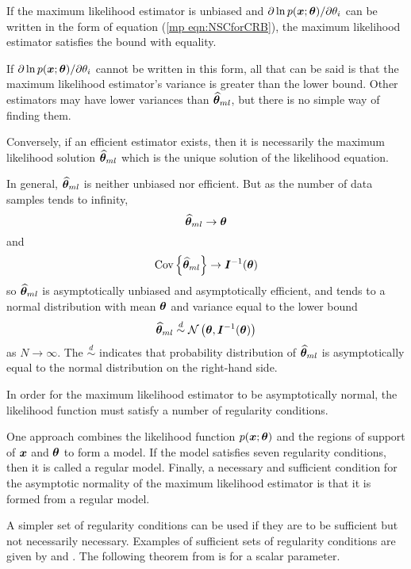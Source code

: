 If the maximum likelihood estimator is unbiased and 
${\partial}\ln p(\bm{x};\bm{\theta})/{\partial}\theta_{i}$ can be written in the form of equation 
(\ref{mp eqn:NSCforCRB}), the maximum likelihood estimator satisfies the
\CR bound with equality.  

If ${\partial}\ln p(\bm{x};\bm{\theta})/{\partial}\theta_{i}$ cannot be written in this form,
all that can be said is that the maximum likelihood estimator's variance is
greater than the \CR lower bound.  Other estimators may have lower variances 
than $\widehat{\bm{\theta}}_{ml}$, but there is no simple way of finding them.

Conversely, if an efficient estimator exists, then it is necessarily the
maximum likelihood solution $\widehat{\bm{\theta}}_{ml}$ which is the unique solution of the
likelihood equation.

In general, $\widehat{\bm{\theta}}_{ml}$ is neither unbiased nor efficient.  But as the number of
data samples tends to infinity,
\begin{equation}
\widehat{\bm{\theta}}_{ml}\to\bm{\theta}
\end{equation}
and
\begin{equation}
{\mathop{\rm Cov}\nolimits\left\{\widehat{\bm{\theta}}_{ml}\right\}}\to\bm{I}^{-1}(\bm{\theta})
\end{equation}
so $\widehat{\bm{\theta}}_{ml}$ is asymptotically unbiased and asymptotically efficient,
and tends to a normal distribution with mean $\bm{\theta}$ and variance equal to 
the \CR lower bound
\begin{equation}
\widehat{\bm{\theta}}_{ml}\stackrel{d}{\sim}{\cal N}\left(\bm{\theta},\bm{I}^{-1}(\bm{\theta})\right)
\end{equation}
as $N\rightarrow\infty$.  The $\stackrel{d}{\sim}$ indicates that
probability distribution of $\widehat{\bm{\theta}}_{ml}$ is asymptotically equal to the normal
distribution on the right-hand side.


In order for the maximum likelihood estimator to be asymptotically normal,
the likelihood function must satisfy a number of regularity conditions.  

One approach \cite[p. 175]{Ngu89b} combines the likelihood function
$p(\bm{x};\bm{\theta})$ and the regions of support of $\bm{x}$ and $\bm{\theta}$ to form a
model.   If the model satisfies seven regularity conditions, then it is
called a regular model.  Finally, a necessary and sufficient condition for
the asymptotic normality of the maximum likelihood estimator is that it is
formed from a regular model.

A simpler set of regularity conditions can be used if they are to be
sufficient but not necessarily necessary.  Examples of sufficient sets of
regularity conditions are given by \cite[section 5f.1]{Rao65} and 
\cite[appendix 7B]{Kay93}.  The following theorem from \cite{Kay93} is for a
scalar parameter.

